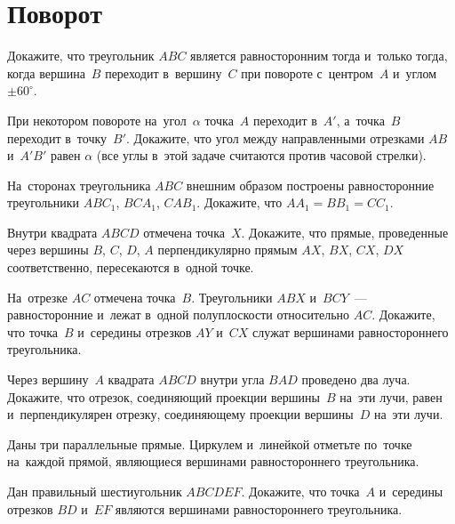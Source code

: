 

\section*{Поворот}


\begin{problems}

\item
Докажите, что треугольник $ABC$ является равносторонним тогда и~только тогда,
когда вершина~$B$ переходит в~вершину~$C$ при повороте с~центром~$A$ и~углом
$\pm 60^{\circ}$.

\item
При некотором повороте на~угол~$\alpha$ точка~$A$ переходит в~$A'$, а~точка~$B$
переходит в~точку~$B'$.
Докажите, что угол между направленными отрезками $AB$ и~$A'B'$ равен $\alpha$
(все углы в~этой задаче считаются против часовой стрелки).

\item
На~сторонах треугольника $ABC$ внешним образом построены равносторонние
треугольники $A B C_1$, $B C A_1$, $C A B_1$.
Докажите, что $A A_1 = B B_1 = C C_1$.

\item
Внутри квадрата $ABCD$ отмечена точка~$X$.
Докажите, что прямые, проведенные через вершины $B$, $C$, $D$, $A$
перпендикулярно прямым $AX$, $BX$, $CX$, $DX$ соответственно, пересекаются
в~одной точке.

\item
На~отрезке $AC$ отмечена точка~$B$.
Треугольники $ABX$ и~$BCY$~--- равносторонние и~лежат в~одной полуплоскости
относительно $AC$.
Докажите, что точка~$B$ и~середины отрезков $AY$ и~$CX$ служат вершинами
равностороннего треугольника.

\item
Через вершину~$A$ квадрата $ABCD$ внутри угла $BAD$ проведено два луча.
Докажите, что отрезок, соединяющий проекции вершины~$B$ на~эти лучи, равен
и~перпендикулярен отрезку, соединяющему проекции вершины~$D$ на~эти лучи.

\item
Даны три параллельные прямые.
Циркулем и~линейкой отметьте по~точке на~каждой прямой, являющиеся вершинами
равностороннего треугольника.

\item
Дан правильный шестиугольник $ABCDEF$.
Докажите, что точка~$A$ и~середины отрезков $BD$ и~$EF$ являются вершинами
равностороннего треугольника.


\end{problems}
